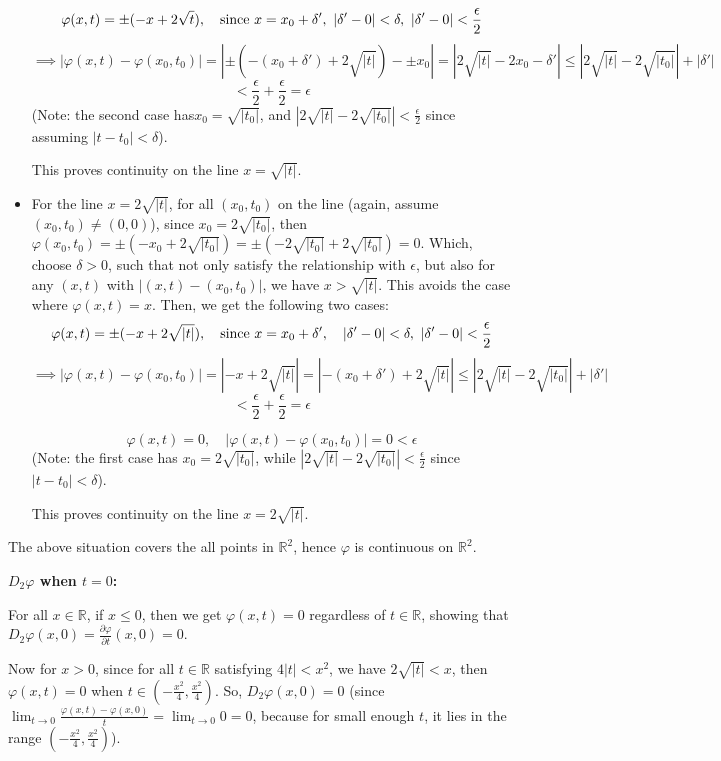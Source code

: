 \documentclass{article}
\begin{document}
\begin{itemize}
    $$\varphi(x,t)=\pm(-x+2\sqrt{t}),\quad \textmd{since } x = x_0+\delta',\ |\delta'-0|<\delta,\ |\delta'-0| < \frac{\epsilon}{2}$$
    $$\implies |\varphi(x,t)-\varphi(x_0,t_0)| = |\pm(-(x_0+\delta')+2\sqrt{|t|})-\pm x_0| = |2\sqrt{|t|} - 2x_0-\delta'| \leq |2\sqrt{|t|}-2\sqrt{|t_0|}|+|\delta'|$$
    $$< \frac{\epsilon}{2}+\frac{\epsilon}{2}=\epsilon$$
    (Note: the second case has$x_0=\sqrt{|t_0|}$, and $|2\sqrt{|t|}-2\sqrt{|t_0|}|<\frac{\epsilon}{2}$ since assuming $|t-t_0|<\delta$).
    
    This proves continuity on the line $x=\sqrt{|t|}$.

    \item For the line $x=2\sqrt{|t|}$, for all $(x_0,t_0)$ on the line (again, assume $(x_0,t_0)\neq (0,0)$), since $x_0=2\sqrt{|t_0|}$, then $\varphi(x_0,t_0)=\pm (-x_0+2\sqrt{|t_0|}) = \pm(-2\sqrt{|t_0|}+2\sqrt{|t_0|}) = 0$. Which, choose $\delta>0$, such that not only satisfy the relationship with $\epsilon$, but also for any $(x,t)$ with $|(x,t)-(x_0,t_0)|$, we have $x>\sqrt{|t|}$. This avoids the case where $\varphi(x,t)=x$. Then, we get the following two cases:
    $$\varphi(x,t)=\pm(-x+2\sqrt{|t|}),\quad \textmd{since } x=x_0+\delta',\quad |\delta'-0|<\delta,\ |\delta'-0|<\frac{\epsilon}{2}$$
    $$\implies |\varphi(x,t)-\varphi(x_0,t_0)| = |-x+2\sqrt{|t|}| = |-(x_0+\delta')+2\sqrt{|t|}|\leq |2\sqrt{|t|}-2\sqrt{|t_0|}|+|\delta'|$$
    $$< \frac{\epsilon}{2}+\frac{\epsilon}{2}=\epsilon$$

    $$\varphi(x,t)=0,\quad |\varphi(x,t)-\varphi(x_0,t_0)| = 0<\epsilon$$
    (Note: the first case has $x_0=2\sqrt{|t_0|}$, while $|2\sqrt{|t|}-2\sqrt{|t_0|}|<\frac{\epsilon}{2}$ since $|t-t_0|<\delta$).

    This proves continuity on the line $x=2\sqrt{|t|}$.
\end{itemize}
The above situation covers the all points in $\mathbb{R}^2$, hence $\varphi$ is continuous on $\mathbb{R}^2$.

\hfil

\textbf{$D_2\varphi$ when $t=0$:}

For all $x\in\mathbb{R}$, if $x\leq 0$, then we get $\varphi(x,t)=0$ regardless of $t\in\mathbb{R}$, showing that $D_2\varphi(x,0) = \frac{\partial \varphi}{\partial t}(x,0) = 0$.

Now for $x> 0$, since for all $t\in\mathbb{R}$ satisfying $4|t|<x^2$, we have $2\sqrt{|t|}<x$, then $\varphi(x,t)=0$ when $t\in (-\frac{x^2}{4},\frac{x^2}{4})$. So, $D_2\varphi(x,0)=0$ (since $\lim_{t\rightarrow 0}\frac{\varphi(x,t)-\varphi(x,0)}{t} = \lim_{t\rightarrow 0}0 = 0$, because for small enough $t$, it lies in the range $(-\frac{x^2}{4},\frac{x^2}{4})$).
\end{document}
